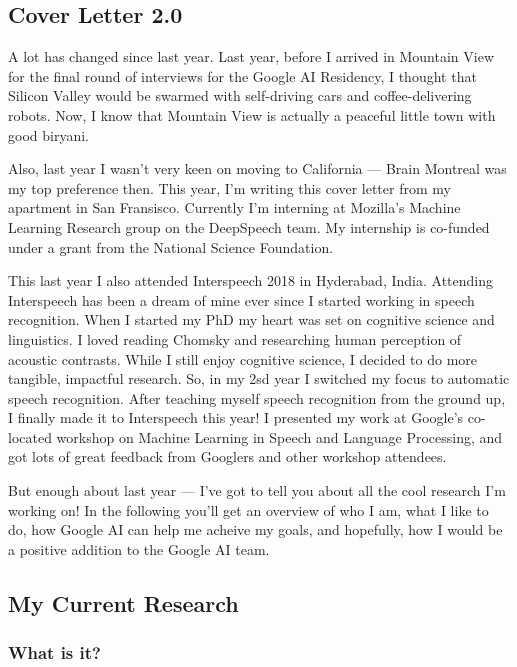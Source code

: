 \documentclass[12pt,a4paper]{article}
\begin{document}
\subsection*{Cover Letter 2.0}


A lot has changed since last year. Last year, before I arrived in Mountain View for the final round of interviews for the Google AI Residency, I thought that Silicon Valley would be swarmed with self-driving cars and coffee-delivering robots. Now, I know that Mountain View is actually a peaceful little town with good biryani.

Also, last year I wasn't very keen on moving to California --- Brain Montreal was my top preference then. This year, I'm writing this cover letter from my apartment in San Fransisco. Currently I'm interning at Mozilla's Machine Learning Research group on the DeepSpeech team. My internship is co-funded under a grant from the National Science Foundation. 

This last year I also attended Interspeech 2018 in Hyderabad, India. Attending Interspeech has been a dream of mine ever since I started working in speech recognition. When I started my PhD my heart was set on cognitive science and linguistics. I loved reading Chomsky and researching human perception of acoustic contrasts. While I still enjoy cognitive science, I decided to do more tangible, impactful research. So, in my 2sd year I switched my focus to automatic speech recognition. After teaching myself speech recognition from the ground up, I finally made it to Interspeech this year! I presented my work at Google's co-located workshop on Machine Learning in Speech and Language Processing, and got lots of great feedback from Googlers and other workshop attendees.

But enough about last year --- I've got to tell you about all the cool research I'm working on! In the following you'll get an overview of who I am, what I like to do, how Google AI can help me acheive my goals, and hopefully, how I would be a positive addition to the Google AI team.


\subsection*{My Current Research}

\subsubsection*{What is it?}
\end{document}
